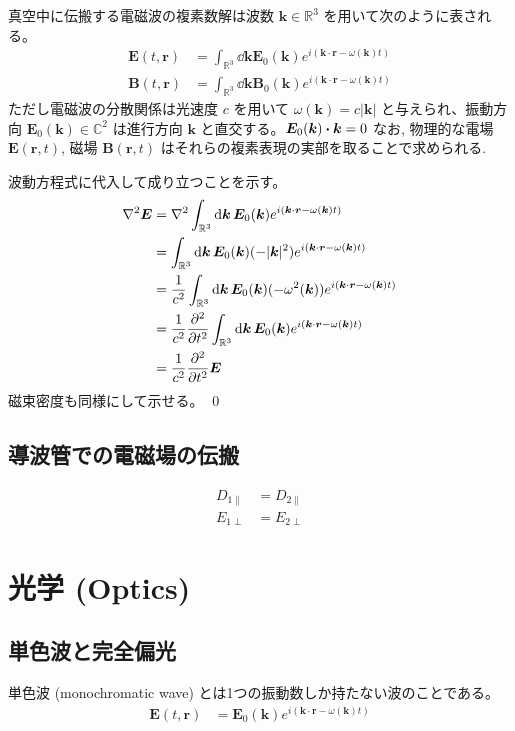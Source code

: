 \documentclass[uplatex,dvipdfmx,a4paper,11pt]{jlreq}
\makeatletter
\newcommand{\CC}{\mathbb{C}}
\newcommand{\RR}{\mathbb{R}}
\newcommand{\EE}{\bm{E}}
\newcommand{\BB}{\bm{B}}
\newcommand{\rr}{\bm{r}}
\newcommand{\kk}{\bm{k}}
\theoremstyle{definition}
\renewenvironment{proof}[1][\proofname]{\par
  \normalfont
  \topsep6\p@\@plus6\p@ \trivlist
  \item[\hskip\labelsep{\bfseries #1}\@addpunct{\bfseries}]\ignorespaces\quad\par
}{%
  \qed\endtrivlist\@endpefalse
}
\renewcommand\proofname{証明}
\makeatother
\begin{document}
\begin{theorem}[]
  真空中に伝搬する電磁波の複素数解は波数 $\kk\in\RR^3$ を用いて次のように表される。
  \begin{align}
    \EE(t, \rr) & = \int_{\RR^3}\dd{\kk}\EE_0(\kk)e^{i(\kk\cdot\rr - \omega(\kk)t)} \\
    \BB(t, \rr) & = \int_{\RR^3}\dd{\kk}\BB_0(\kk)e^{i(\kk\cdot\rr - \omega(\kk)t)}
  \end{align}
  ただし電磁波の分散関係は光速度 $c$ を用いて $\omega(\kk) = c|\kk|$ と与えられ、振動方向 $\EE_0(\kk)\in\CC^2$ は進行方向 $\kk$ と直交する。$\EE_0(\kk)\vdot\kk = 0$
  なお, 物理的な電場 $\EE(\rr, t)$, 磁場 $\BB(\rr, t)$ はそれらの複素表現の実部を取ることで求められる.
\end{theorem}
\begin{proof}
  波動方程式に代入して成り立つことを示す。
  \begin{align}
    \nabla^2\EE & = \nabla^2\int_{\RR^3}\dd{\kk}\EE_0(\kk)e^{i(\kk\cdot\rr - \omega(\kk)t)}                      \\
                & = \int_{\RR^3}\dd{\kk}\EE_0(\kk)(-|\kk|^2)e^{i(\kk\cdot\rr - \omega(\kk)t)}                    \\
                & = \frac{1}{c^2}\int_{\RR^3}\dd{\kk}\EE_0(\kk)(-\omega^2(\kk))e^{i(\kk\cdot\rr - \omega(\kk)t)} \\
                & = \frac{1}{c^2}\pdv[2]{t}\int_{\RR^3}\dd{\kk}\EE_0(\kk)e^{i(\kk\cdot\rr - \omega(\kk)t)}       \\
                & = \frac{1}{c^2}\pdv[2]{t}\EE
  \end{align}
  磁束密度も同様にして示せる。
\end{proof}

\subsection{導波管での電磁場の伝搬}
\begin{align}
  D_{1\parallel} & = D_{2\parallel} \\
  E_{1\perp}     & = E_{2\perp}
\end{align}


\section{光学 (Optics)}
\subsection{単色波と完全偏光}
\begin{definition}[単色波]
  単色波 (monochromatic wave) とは1つの振動数しか持たない波のことである。
  \begin{align}
    \EE(t, \rr) & = \EE_0(\kk)e^{i(\kk\cdot\rr - \omega(\kk)t)}
  \end{align}
\end{definition}
\end{document}

